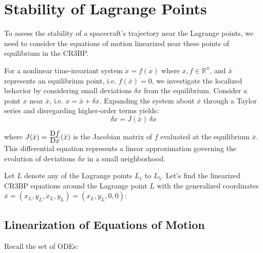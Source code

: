 
\section{Stability of Lagrange Points}

To assess the stability of a spacecraft's trajectory near the Lagrange points, we need to consider the equations of motion linearized near these points of equilibrium in the CR3BP.

\vspace{\baselineskip}

For a nonlinear time-invariant system $\dot{x} = f(x)$ where $x, f \in \mathbb{R}^n$, and $\bar{x}$ represents an equilibrium point, i.e. $f(\bar{x})=0$, we investigate the localized behavior by considering small deviations
$\delta x$ from the equilibrium. Consider a point $x$ near $\bar{x}$, i.e. $x = \bar{x} + \delta x$. Expanding the system about $\bar{x}$ through a Taylor series and disregarding higher-order terms yields:
\begin{equation}
    \delta \dot{x} = J(\bar{x}) \, \delta x
\end{equation}

where $J(\bar{x}) = \frac{\displaystyle \textrm{D}f}{\displaystyle \textrm{D}x} (\bar{x})$ is the Jacobian matrix of $f$ evaluated at the equilibrium $\bar{x}$. This differential equation represents a linear approximation governing the evolution of deviations $\delta x$ in a small neighborhood. 

\vspace{\baselineskip}

Let $L$ denote any of the Lagrange points $L_1$ to $L_5$. Let's find the linearized CR3BP equations around the Lagrange point $L$ with the generalized coordinates $\bar{x} = (x_L,y_L,\dot{x}_L,\dot{y}_L) = (x_L,y_L,0,0)$:

\subsection{Linearization of Equations of Motion}

Recall the set of ODEs:


